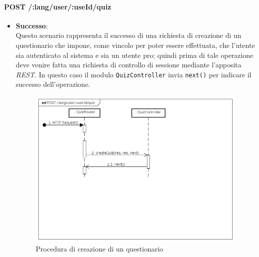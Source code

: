 \paragraph{POST /:lang/user/:useId/quiz} %
\begin{itemize}
\item \textbf{Successo}:\\
Questo scenario rappresenta il successo di una richiesta di creazione di un questionario che impone, come vincolo per poter essere effettuata, che l'utente sia autenticato al sistema e sia un utente pro; quindi prima di tale operazione deve venire fatta una richiesta di controllo di sessione mediante l'apposita \textit{REST}. In questo caso il modulo \texttt{QuizController} invia \texttt{next()} per indicare il successo dell'operazione.
\label{Procedura di creazione di un questionario}
\begin{figure}[ht]
	\centering
	\includegraphics[scale=0.40]{UML/DiagrammiDiSequenza/Back-end/POST__lang_user_userId_quiz_success.png}
	\caption{Procedura di creazione di un questionario}
\end{figure}
\FloatBarrier


\end{itemize}
